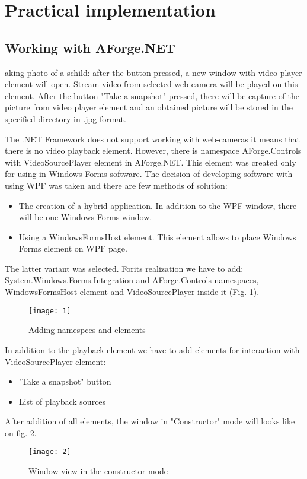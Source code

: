 \documentclass[12pt,journal,compsoc]{D:/Магистратура/English/bare_conf/IEEEtran}
\begin{document}
\section{Practical implementation}
\subsection{Working with AForge.NET}
aking photo of a schild: after the button pressed, a new window with video player element will open. Stream video from selected web-camera will be played on this element. After the button "Take a snapshot" pressed, there will be capture of the picture from video player element and an obtained picture will be stored in the specified directory in .jpg format. 

The .NET Framework does not support working with web-cameras it means that there is no video playback element. However, there is namespace AForge.Controls with VideoSourcePlayer element in AForge.NET. This element was created only for using in Windows Forms software. The decision of developing software with using WPF was taken and there are few methods of solution:
\begin{itemize}
\item The creation of a hybrid application. In addition to the WPF window, there will be one Windows Forms window.
\item Using a WindowsFormsHost element. This element allows to place Windows Forms element on WPF page.
\end{itemize}

The latter variant was selected. Forits realization we have to add: System.Windows.Forms.Integration and AForge.Controls namespaces, WindowsFormsHost element and VideoSourcePlayer inside it (Fig. 1).
\begin{figure}[h]
\centering
\texttt{[image: 1]}
\centering
\caption{Adding namespces and elements}
\end{figure}

In addition to the playback element we have to add elements for interaction with VideoSourcePlayer element:
\begin{itemize}
\item "Take a snapshot" button
\item List of playback sources
\end{itemize}
After addition of all elements, the window in "Constructor" mode will looks like on fig. 2.
\begin{figure}[h]
\centering
\texttt{[image: 2]}
\centering
\caption{Window view in the constructor mode}
\end{figure}
\end{document}
